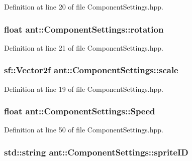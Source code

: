 Definition at line 20 of file Component\+Settings.\+hpp.

\hypertarget{classant_1_1_component_settings_af6510ce7e9046dae09b36ae090ff29e2}{
\subsubsection[{rotation}]{\setlength{\rightskip}{0pt plus 5cm}float ant\+::\+Component\+Settings\+::rotation}}\label{classant_1_1_component_settings_af6510ce7e9046dae09b36ae090ff29e2}


Definition at line 21 of file Component\+Settings.\+hpp.

\hypertarget{classant_1_1_component_settings_af5401836ccc8522236ce460c3b0b7dc4}{
\subsubsection[{scale}]{\setlength{\rightskip}{0pt plus 5cm}sf\+::\+Vector2f ant\+::\+Component\+Settings\+::scale}}\label{classant_1_1_component_settings_af5401836ccc8522236ce460c3b0b7dc4}


Definition at line 19 of file Component\+Settings.\+hpp.

\hypertarget{classant_1_1_component_settings_a56a5b8bb6e11382014d1b160517a27d8}{
\subsubsection[{Speed}]{\setlength{\rightskip}{0pt plus 5cm}float ant\+::\+Component\+Settings\+::\+Speed\hspace{0.3cm}{\ttfamily [private]}}}\label{classant_1_1_component_settings_a56a5b8bb6e11382014d1b160517a27d8}


Definition at line 50 of file Component\+Settings.\+hpp.

\hypertarget{classant_1_1_component_settings_aa75c8c1dee1ae6487858af03b2c0d0ce}{
\subsubsection[{sprite\+I\+D}]{\setlength{\rightskip}{0pt plus 5cm}std\+::string ant\+::\+Component\+Settings\+::sprite\+I\+D}}\label{classant_1_1_component_settings_aa75c8c1dee1ae6487858af03b2c0d0ce}



